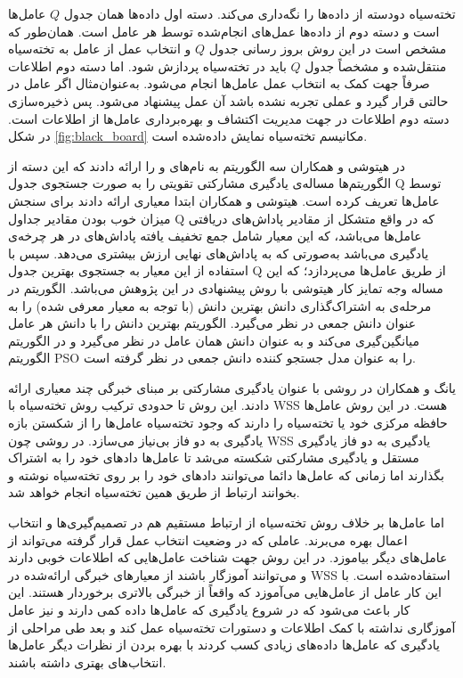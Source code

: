 تخته‌سیاه دودسته از داده‌ها را نگه‌داری می‌کند. دسته اول داده‌ها همان جدول $Q$ عامل‌ها است و دسته دوم از داده‌ها عمل‌های انجام‌شده توسط هر عامل است. همان‌طور که مشخص است در این روش بروز رسانی جدول $Q$ و انتخاب عمل از عامل به تخته‌سیاه منتقل‌شده و مشخصاً جدول $Q$ باید در تخته‌سیاه پردازش شود. اما دسته دوم اطلاعات صرفاً جهت کمک به انتخاب عمل عامل‌ها انجام می‌شود. به‌عنوان‌مثال اگر عامل در حالتی قرار گیرد و عملی تجربه نشده باشد آن عمل پیشنهاد می‌شود. پس ذخیره‌سازی دسته دوم اطلاعات در جهت مدیریت اکتشاف و بهره‌برداری عامل‌ها از اطلاعات است. در شکل \ref{fig:black_board} مکانیسم تخته‌سیاه نمایش داده‌شده است.


در  هیتوشی و همکاران سه الگوریتم به نام‌های  و  را ارائه دادند که این دسته از الگوریتم‌ها مساله‌ی یادگیری مشارکتی تقویتی را به صورت جستجوی‌ جدول Q توسط عامل‌ها تعریف کرده است. هیتوشی و همکاران ابتدا معیاری ارائه دادند برای سنجش میزان خوب بودن مقادیر جداول Q که در واقع متشکل از مقادیر پاداش‌های دریافتی عامل‌ها می‌باشد، که این معیار شامل جمع تخفیف یافته پاداش‌های در هر چرخه‌ی یادگیری می‌باشد به‌صورتی که به پاداش‌های نهایی ارزش بیشتری می‌دهد. سپس با استفاده از این معیار به جستجوی بهترین جدول Q از طریق عامل‌ها می‌پردازد؛ که این مساله وجه تمایز کار هیتوشی با روش پیشنهادی در این پژوهش می‌باشد. الگوریتم  در مرحله‌ی به اشتراک‌گذاری دانش بهترین دانش (با توجه به معیار معرفی شده) را به عنوان دانش جمعی در نظر می‌گیرد. الگوریتم  بهترین دانش را با دانش هر عامل میانگین‌گیری می‌کند و به عنوان دانش همان عامل در نظر می‌گیرد و در الگوریتم  الگوریتم PSO را به عنوان مدل جستجو کننده‌ دانش جمعی در نظر گرفته است.


یانگ و همکاران در  روشی با عنوان یادگیری مشارکتی بر مبنای خبرگی چند معیاری ارائه‌ دادند. این روش تا حدودی ترکیب روش تخته‌سیاه با WSS هست. در این روش عامل‌ها حافظه مرکزی خود یا تخته‌سیاه را دارند که وجود تخته‌سیاه عامل‌ها را از شکستن بازه یادگیری به دو فاز بی‌نیاز می‌سازد. در روشی چون WSS یادگیری به دو فاز یادگیری مستقل و یادگیری مشارکتی شکسته می‌شد تا عامل‌ها دادهای خود را به اشتراک بگذارند اما زمانی که عامل‌ها دائما می‌توانند دادهای خود را بر روی تخته‌سیاه نوشته و بخوانند ارتباط از طریق همین تخته‌سیاه انجام خواهد شد.

اما عامل‌ها بر خلاف روش تخته‌سیاه از ارتباط مستقیم هم در تصمیم‌گیری‌ها و انتخاب اعمال بهره می‌برند. عاملی که در وضعیت انتخاب عمل قرار گرفته می‌تواند از عامل‌های دیگر بیاموزد. در این روش جهت شناخت عامل‌هایی که اطلاعات خوبی دارند و می‌توانند آموزگار باشند از معیارهای خبرگی ارائه‌شده در WSS استفاده‌شده است. با این کار عامل از عامل‌هایی می‌آموزد که واقعاً از خبرگی بالاتری برخوردار هستند. این کار باعث می‌شود که در شروع یادگیری که عامل‌ها داده کمی دارند و نیز عامل آموزگاری نداشته با کمک اطلاعات و دستورات تخته‌سیاه عمل کند و بعد طی مراحلی از یادگیری که عامل‌ها داده‌های زیادی کسب کردند با بهره بردن از نظرات دیگر عامل‌ها انتخاب‌های بهتری داشته باشند.

